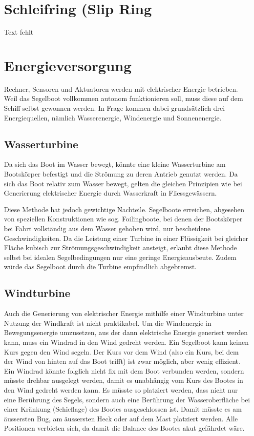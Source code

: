 \section{Schleifring (Slip Ring}


Text fehlt


\section{Energieversorgung}

Rechner, Sensoren und Aktuatoren werden mit elektrischer Energie betrieben. Weil das Segelboot vollkommen autonom funktionieren soll, muss diese auf dem Schiff selbst gewonnen werden. In Frage kommen dabei grundsätzlich drei Energiequellen, nämlich Wasserenergie, Windenergie und Sonnenenergie. 

\subsection{Wasserturbine}
Da sich das Boot im Wasser bewegt, könnte eine kleine Wasserturbine am Bootskörper befestigt und die Strömung zu deren Antrieb genutzt werden. Da sich das Boot relativ zum Wasser bewegt, gelten die gleichen Prinzipien wie bei Generierung elektrischer Energie durch Wasserkraft in Fliessgewässern.

Diese Methode hat jedoch gewichtige Nachteile. Segelboote erreichen, abgesehen von speziellen Konstruktionen wie sog. Foilingboote, bei denen der Bootskörper bei Fahrt vollständig aus dem Wasser gehoben wird, nur bescheidene Geschwindigkeiten. Da die Leistung einer Turbine in einer Flüssigkeit bei gleicher Fläche kubisch zur Strömungsgeschwindigkeit ansteigt, erlaubt diese Methode selbst bei idealen Segelbedingungen nur eine geringe Energieausbeute. Zudem würde das Segelboot durch die Turbine empfindlich abgebremst. 

\subsection{Windturbine}
Auch die Generierung von elektrischer Energie mithilfe einer Windturbine unter Nutzung der Windkraft ist nicht praktikabel. Um die Windenergie in Bewegungsenergie umzusetzen, aus der dann elektrische Energie generiert werden kann, muss ein Windrad in den Wind gedreht werden. Ein Segelboot kann keinen Kurs gegen den Wind segeln. Der Kurs vor dem Wind (also ein Kurs, bei dem der Wind von hinten auf das Boot trifft) ist zwar möglich, aber wenig effizient. Ein Windrad könnte folglich nicht fix mit dem Boot verbunden werden, sondern müsste drehbar ausgelegt werden, damit es unabhängig vom Kurs des Bootes in den Wind gedreht werden kann. Es müsste so platziert werden, dass nicht nur eine Berührung des Segels, sondern auch eine Berührung der Wasseroberfläche bei einer Kränkung (Schieflage) des Bootes ausgeschlossen ist. Damit müsste es am äussersten Bug, am äussersten Heck oder auf dem Mast platziert werden. Alle Positionen verbieten sich, da damit die Balance des Bootes akut gefährdet wäre. 


